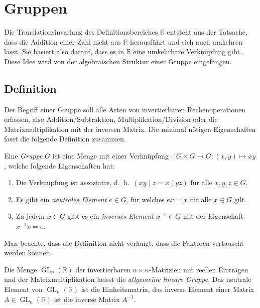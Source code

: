 %
%
%
\section{Gruppen
\label{buch:gruppen:section:gruppe}}
Die Translationsinvarianz des Definitionsbereiches $\mathbb{R}$
entsteht aus der Tatsache, dass die Addition einer Zahl
nicht aus $\mathbb{R}$ herausführt und sich auch umkehren lässt.
Sie basiert also darauf, dass es in $\mathbb{R}$ eine umkehrbare
Verknüpfung gibt.
Diese Idee wird von der algebraischen Struktur einer Gruppe eingefangen.

%
%
\subsection{Definition
\label{buch:gruppen:subsection:definition}}
Der Begriff einer Gruppe soll alle Arten von invertierbaren Rechenoperationen
erfassen, also Addition/Subtraktion, Multiplikation/Division oder
die Matrixmultiplikation mit der inversen Matrix.
Die minimal nötigen Eigenschaften fasst die folgende Definition zusammen.

\begin{definition}
\label{buch:gruppen:definition:gruppe}
Eine {\em Gruppe} $G$ ist eine Menge mit einer Verknüpfung
$\cdot \colon G\times G\to G : (x,y) \mapsto xy $, welche folgende
Eigenschaften hat:
\begin{enumerate}
\item
Die Verknüpfung ist assoziativ, d.~h.~$(xy)z=x(yz)$ für alle
$x,y,z\in G$.
\item
Es gibt ein {\em neutrales Element} $e\in G$, für welches $ex=x$ für alle
$x\in G$ gilt.
%
\item 
Zu jedem $x\in G$ gibt es ein {\em inverses Element} $x^{-1}\in G$ mit der
Eigenschaft $x^{-1}x=e$.
%
\end{enumerate}
\end{definition}

Man beachte, dass die Defiinition nicht verlangt, dass die Faktoren
vertauscht werden können. 

\begin{beispiel}
Die Menge $\operatorname{GL}_n(\mathbb{R})$ der invertierbaren
$n\times n$-Matrizien mit reellen Einträgen und der Matrixmultiplikation
heisst die {\em allgemeine lineare Gruppe}.
%
%
Das neutrale Element von $\operatorname{GL}_n(\mathbb{R})$ ist die
Einheitsmatrix, das inverse Element einer Matrix
$A\in \operatorname{GL}_n(\mathbb{R})$
ist die inverse Matrix $A^{-1}$.
\end{beispiel}

